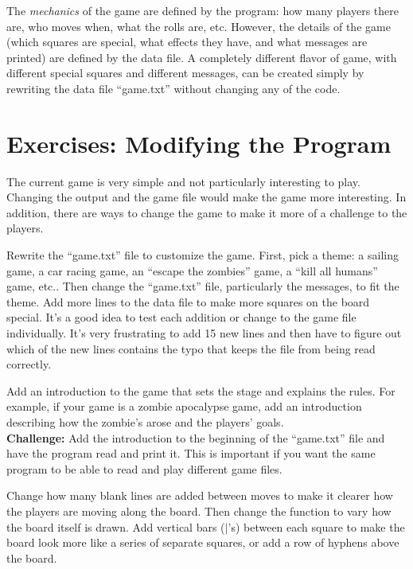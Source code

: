 The \emph{mechanics} of the game are defined by the program: how many players there are, who moves when, what the rolls are, etc.  However, the details of the game (which squares are special, what effects they have, and what messages are printed) are defined by the data file.  A completely different flavor of game, with different special squares and different messages, can be created simply by rewriting the data file ``game.txt'' without changing any of the code.  

\vspace{+0.25cm}
{\color{\mycolor}\noindent\hrulefill}
\section{Exercises: Modifying the Program}

The current game is very simple and not particularly interesting to play.  Changing the output and the game file would make the game more interesting.  In addition, there are ways to change the game to make it more of a challenge to the players.  

Rewrite the ``game.txt'' file to customize the game.  First, pick a theme: a sailing game, a car racing game, an ``escape the zombies'' game, a ``kill all humans'' game, etc..  Then change the ``game.txt'' file, particularly the messages, to fit the theme.  Add more lines to the data file to make more squares on the board special.  It's a good idea to test each addition or change to the game file individually.  It's very frustrating to add 15 new lines and then have to figure out which of the new lines contains the typo that keeps the file from being read correctly.

Add an introduction to the game that sets the stage and explains the rules.  For example, if your game is a zombie apocalypse game, add an introduction describing how the zombie's arose and the players' goals.    \\
{\bf Challenge:} Add the introduction to the beginning of the ``game.txt'' file and have the program read and print it.  This is important if you want the same program to be able to read and play different game files.

Change how many blank lines are added between moves to make it clearer how the players are moving along the board.  Then change the  function to vary how the board itself is drawn.  Add vertical bars ($|$'s)  between each square to make the board look more like a series of separate squares, or add a row of hyphens above the board.

